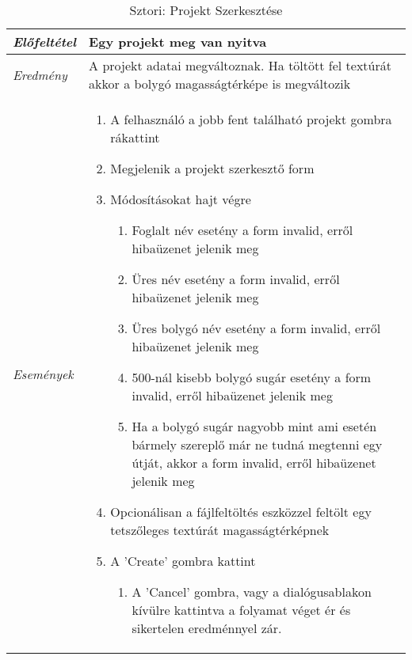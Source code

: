 \begin{table}[H]
	\centering
	\begin{tabular}{ | m{} | m{} | }
		\hline
		\emph{Előfeltétel} & Egy projekt meg van nyitva  \\
		\hline
		\emph{Eredmény} & A projekt adatai megváltoznak. Ha töltött fel textúrát akkor a bolygó magasságtérképe is megváltozik    \\
		\hline
		\emph{Események} &

		\begin{enumerate}
			\item A felhasználó a jobb fent található projekt gombra rákattint
			\item Megjelenik a projekt szerkesztő form
			\item Módosításokat hajt végre
			\begin{enumerate}
				\item Foglalt név esetény a form invalid, erről hibaüzenet jelenik meg
				\item Üres név esetény a form invalid, erről hibaüzenet jelenik meg
				\item Üres bolygó név esetény a form invalid, erről hibaüzenet jelenik meg
				\item 500-nál kisebb bolygó sugár esetény a form invalid, erről hibaüzenet jelenik meg
				\item Ha a bolygó sugár nagyobb mint ami esetén bármely szereplő már ne tudná megtenni egy útját, akkor a form invalid, erről hibaüzenet jelenik meg
			\end{enumerate}
			\item Opcionálisan a fájlfeltöltés eszközzel feltölt egy tetszőleges textúrát magasságtérképnek
			\item A 'Create' gombra kattint
			\begin{enumerate}
				\item A 'Cancel' gombra, vagy a dialógusablakon kívülre kattintva a folyamat véget ér és sikertelen eredménnyel zár.
			\end{enumerate}
		\end{enumerate}

		\\
		\hline
	\end{tabular}
	\caption{Sztori: Projekt Szerkesztése}
	\label{tab:story-project-edit}
\end{table}


